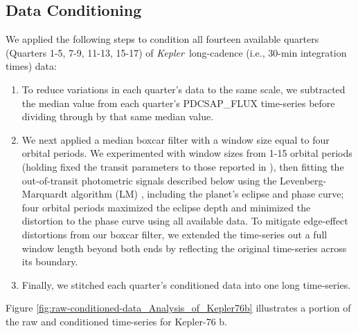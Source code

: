 \documentclass[manuscript]{aastex62}
\newcommand{\kepler}{{\it Kepler}}
\begin{document}
\subsection{Data Conditioning}
We applied the following steps to condition all fourteen available quarters (Quarters 1-5, 7-9, 11-13, 15-17) of \kepler\ long-cadence (i.e., 30-min integration times) data:
\begin{enumerate}
\item To reduce variations in each quarter's data to the same scale, we subtracted the median value from each quarter's PDCSAP\_FLUX time-series before dividing through by that same median value.
\item We next applied a median boxcar filter with a window size equal to four orbital periods. We experimented with window sizes from 1-15 orbital periods (holding fixed the transit parameters to those reported in \citealt{2013ApJ...771...26F}), then fitting the out-of-transit photometric signals described below using the Levenberg-Marquardt algorithm (LM) \citep{newville_2014_11813}, including the planet's eclipse and phase curve; four orbital periods maximized the eclipse depth and minimized the distortion to the phase curve using all available data. To mitigate edge-effect distortions from our boxcar filter, we extended the time-series out a full window length beyond both ends by reflecting the original time-series across its boundary.
\item Finally, we stitched each quarter's conditioned data into one long time-series.
\end{enumerate}
Figure \ref{fig:raw-conditioned-data_Analysis_of_Kepler76b} illustrates a portion of the raw and conditioned time-series for Kepler-76 b. 
\end{document}
